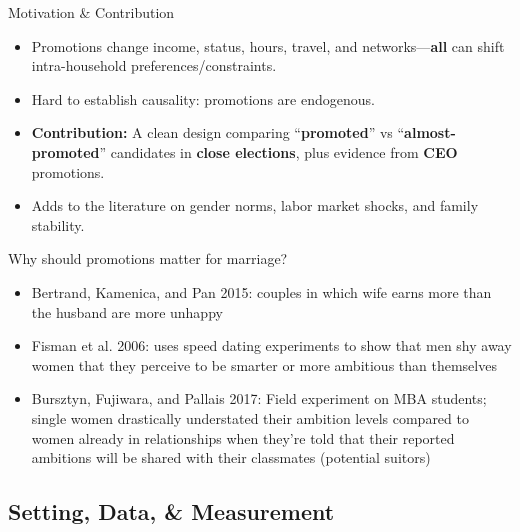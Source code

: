 \documentclass[11pt,notes=hide,aspectratio=169,mathserif]{beamer}
\begin{document}
\begin{frame}{Motivation \& Contribution}
\small
\begin{itemize}
  \item Promotions change income, status, hours, travel, and networks—\textbf{all} can shift intra-household preferences/constraints.
  \item Hard to establish causality: promotions are endogenous. 
  \item \textbf{Contribution:} A clean design comparing “\textbf{promoted}” vs “\textbf{almost-promoted}” candidates in \textbf{close elections}, plus evidence from \textbf{CEO} promotions.
  \item Adds to the literature on gender norms, labor market shocks, and family stability.
\end{itemize}
\end{frame}

\begin{frame}{Why should promotions matter for marriage?}
\small
\begin{itemize}
  \item Bertrand, Kamenica, and Pan 2015: couples in which wife earns more than the husband are more unhappy 
  \item Fisman et al. 2006: uses speed dating experiments to show that men shy away women that they perceive to be smarter or more ambitious than themselves
  \item Bursztyn, Fujiwara, and Pallais 2017: Field experiment on MBA students; single women drastically understated their ambition levels compared to women already
  in relationships when they're told that their reported ambitions will be shared with their classmates (potential suitors)
\end{itemize}
\end{frame}

\subsection{Setting, Data, \& Measurement}
\end{document}
